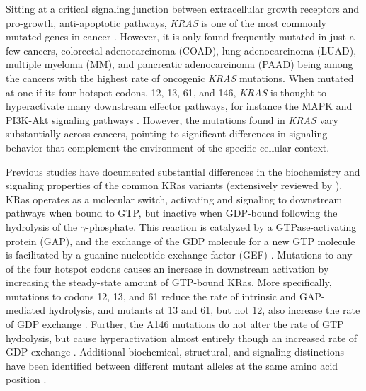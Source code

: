 \documentclass[english, 10pt, letterpaper]{article}
\newcommand{\KRAS}{\emph{KRAS}}
\newcommand{\kras}{KRas}
\begin{document}
Sitting at a critical signaling junction between extracellular growth receptors and pro-growth, anti-apoptotic pathways, \KRAS{} is one of the most commonly mutated genes in cancer \cite{Barbacid1987, Bailey2018}.
However, it is only found frequently mutated in just a few cancers, colorectal adenocarcinoma (COAD), lung adenocarcinoma (LUAD), multiple myeloma (MM), and pancreatic adenocarcinoma (PAAD) being among the cancers with the highest rate of oncogenic \KRAS{} mutations.
When mutated at one if its four hotspot codons, 12, 13, 61, and 146, \KRAS{} is thought to hyperactivate many downstream effector pathways, for instance the MAPK and PI3K-Akt signaling pathways \cite{Simanshu2017}.
However, the mutations found in \KRAS{} vary substantially across cancers, pointing to significant differences in signaling behavior that complement the environment of the specific cellular context.

Previous studies have documented substantial differences in the biochemistry and signaling properties of the common \kras{} variants (extensively reviewed by \cite{Miller2012, Li2018}).
\kras{} operates as a molecular switch, activating and signaling to downstream pathways when bound to GTP, but inactive when GDP-bound following the hydrolysis of the $\gamma$-phosphate.
This reaction is catalyzed by a GTPase-activating protein (GAP), and the exchange of the GDP molecule for a new GTP molecule is facilitated by a guanine nucleotide exchange factor (GEF) \cite{Barbacid1987}.
Mutations to any of the four hotspot codons causes an increase in downstream activation by increasing the steady-state amount of GTP-bound \kras{}.
More specifically, mutations to codons 12, 13, and 61 reduce the rate of intrinsic and GAP-mediated hydrolysis, and mutants at 13 and 61, but not 12, also increase the rate of GDP exchange \cite{Hunter2015a, Smith2013}.
Further, the A146 mutations do not alter the rate of GTP hydrolysis, but cause hyperactivation almost entirely though an increased rate of GDP exchange \cite{Feig1988RelationshipProteins., Edkins2006, Janakiraman2010, Poulin2019}.
Additional biochemical, structural, and signaling distinctions have been identified between different mutant alleles at the same amino acid position \cite{Poulin2019, Hobbs2019AtypicalCancer., Hunter2015a, Li2018, Yu2018, Kovalski2019, Ihle2012, Spoerner2004, Smith2014a, Pantsar2018}.
\end{document}
